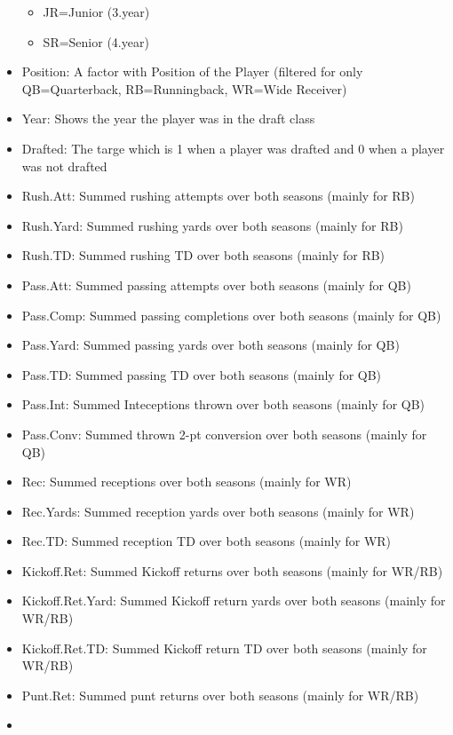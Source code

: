\documentclass[]{article}
\providecommand{\tightlist}{%
  \setlength{\itemsep}{0pt}\setlength{\parskip}{0pt}}
\begin{document}
\begin{itemize}
  \begin{itemize}
  \tightlist
  \item
    JR=Junior (3.year)
  \item
    SR=Senior (4.year)
  \end{itemize}
\item
  Position: A factor with Position of the Player (filtered for only
  QB=Quarterback, RB=Runningback, WR=Wide Receiver)
\item
  Year: Shows the year the player was in the draft class
\item
  Drafted: The targe which is 1 when a player was drafted and 0 when a
  player was not drafted
\item
  Rush.Att: Summed rushing attempts over both seasons (mainly for RB)
\item
  Rush.Yard: Summed rushing yards over both seasons (mainly for RB)
\item
  Rush.TD: Summed rushing TD over both seasons (mainly for RB)
\item
  Pass.Att: Summed passing attempts over both seasons (mainly for QB)
\item
  Pass.Comp: Summed passing completions over both seasons (mainly for
  QB)
\item
  Pass.Yard: Summed passing yards over both seasons (mainly for QB)
\item
  Pass.TD: Summed passing TD over both seasons (mainly for QB)
\item
  Pass.Int: Summed Inteceptions thrown over both seasons (mainly for QB)
\item
  Pass.Conv: Summed thrown 2-pt conversion over both seasons (mainly for
  QB)
\item
  Rec: Summed receptions over both seasons (mainly for WR)
\item
  Rec.Yards: Summed reception yards over both seasons (mainly for WR)
\item
  Rec.TD: Summed reception TD over both seasons (mainly for WR)
\item
  Kickoff.Ret: Summed Kickoff returns over both seasons (mainly for
  WR/RB)
\item
  Kickoff.Ret.Yard: Summed Kickoff return yards over both seasons
  (mainly for WR/RB)
\item
  Kickoff.Ret.TD: Summed Kickoff return TD over both seasons (mainly for
  WR/RB)
\item
  Punt.Ret: Summed punt returns over both seasons (mainly for WR/RB)
\item

\end{itemize}
\end{document}
